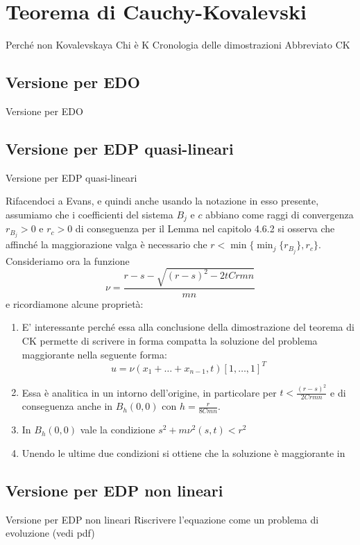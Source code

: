 \chapter{Teorema di Cauchy-Kovalevski}

Perché non Kovalevskaya
Chi è K
Cronologia delle dimostrazioni
Abbreviato CK
\section{Versione per EDO}
Versione per EDO
\section{Versione per EDP quasi-lineari}
Versione per EDP quasi-lineari

Rifacendoci a Evans, e quindi anche usando la notazione in esso presente, 
assumiamo che i coefficienti del sistema $B_j$ e $c$ abbiano come raggi di convergenza $r_{B_j}>0$ e $r_c>0$ 
di conseguenza per il Lemma nel capitolo 4.6.2 si osserva che affinché la maggiorazione valga è necessario 
che $r<\min\{\min_{j} \{r_{B_j}\}, r_c \}$.
Consideriamo ora la funzione $$\nu=\frac{r-s-\sqrt{(r-s)^2-2tCrmn}}{mn}$$ e ricordiamone alcune proprietà:
\begin{enumerate}[1.]

\item
E' interessante perché essa alla conclusione della dimostrazione del teorema di CK 
permette di scrivere in forma compatta la soluzione del problema maggiorante nella seguente forma: 
$$u = \nu(x_1+\ldots+x_{n-1}, t)[1,\ldots,1]^T$$

\item
Essa è analitica in un intorno dell'origine, in particolare per $t<\frac{(r-s)^2}{2Crmn}$ e di 
conseguenza anche in $B_h(0,0)$ con $h=\frac{r}{8Cmn}$.

\item
In $B_h(0,0)$ vale la condizione $s^2+m\nu ^2 (s,t)< r^2$

\item
Unendo le ultime due condizioni si ottiene che la soluzione è maggiorante in 

\end{enumerate}

\section{Versione per EDP non lineari}
Versione per EDP non lineari
Riscrivere l'equazione come un problema di evoluzione (vedi pdf)
